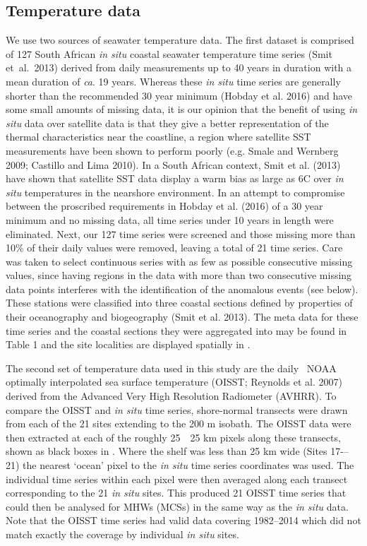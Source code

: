 \documentclass[a4paper,10pt,review]{elsarticle}
\begin{document}
\subsection{Temperature data}
We use two sources of seawater temperature data. The first dataset is comprised of 127 South African \emph{in situ} coastal seawater temperature time series (Smit et al. 2013) derived from daily measurements up to 40 years in duration with a mean duration of \emph{ca}. 19 years. Whereas these \emph{in situ} time series are generally shorter than the recommended 30 year minimum (Hobday et al. 2016) and have some small amounts of missing data, it is our opinion that the benefit of using \emph{in situ} data over satellite data is that they give a better representation of the thermal characteristics near the coastline, a region where satellite SST measurements have been shown to perform poorly (e.g. Smale and Wernberg 2009; Castillo and Lima 2010). In a South African context, Smit et al. (2013) have shown that satellite SST data display a warm bias as large as 6\degree C over \emph{in situ} temperatures in the nearshore environment. In an attempt to compromise between the proscribed requirements in Hobday et al. (2016) of a 30 year minimum and no missing data, all time series under 10 years in length were eliminated. Next, our 127 time series were screened and those missing more than 10\% of their daily values were removed, leaving a total of 21 time series. Care was taken to select continuous series with as few as possible consecutive missing values, since having regions in the data with more than two consecutive missing data points interferes with the identification of the anomalous events (see below). These stations were classified into three coastal sections defined by properties of their oceanography and biogeography (Smit et al. 2013). The meta data for these time series and the coastal sections they were aggregated into may be found in Table 1 and the site localities are displayed spatially in .

The second set of temperature data used in this study are the daily \degree~NOAA optimally interpolated sea surface temperature (OISST; Reynolds et al. 2007) derived from the Advanced Very High Resolution Radiometer (AVHRR). To compare the OISST and \emph{in situ} time series, shore-normal transects were drawn from each of the 21 sites extending to the 200 m isobath. The OISST data were then extracted at each of the roughly 25~\texttimes~25 km pixels along these transects, shown as black boxes in . Where the shelf was less than 25 km wide (Sites 17-–21) the nearest `ocean' pixel to the \emph{in situ} time series coordinates was used. The individual time series within each pixel were then averaged along each transect corresponding to the 21 \emph{in situ} sites. This produced 21 OISST time series that could then be analysed for MHWs (MCSs) in the same way as the \emph{in situ} data. Note that the OISST time series had valid data covering 1982--2014 which did not match exactly the coverage by individual \emph{in situ} sites.
\end{document}
